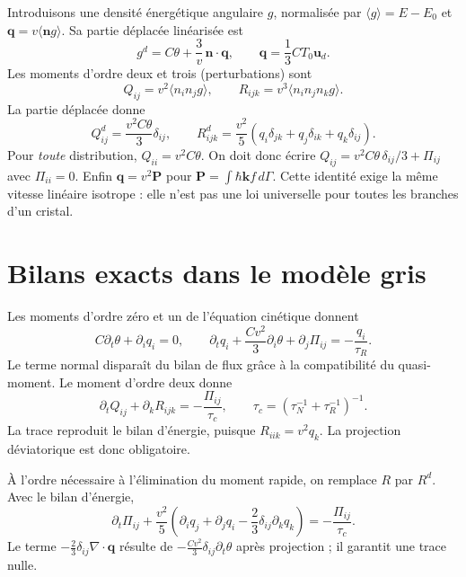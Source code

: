 \documentclass[11pt,a4paper]{article}
\begin{document}
Introduisons une densité énergétique angulaire $g$, normalisée par
$\langle g\rangle=E-E_0$ et $\mathbf q=v\langle\mathbf n g\rangle$.
Sa partie déplacée linéarisée est
\[
 g^d=C\theta+\frac3v\,\mathbf n\cdot\mathbf q,\qquad
 \mathbf q=\frac13CT_0\mathbf u_d .
\]
Les moments d'ordre deux et trois (perturbations) sont
\[
 Q_{ij}=v^2\langle n_i n_j g\rangle,\qquad
 R_{ijk}=v^3\langle n_i n_j n_k g\rangle.
\]
La partie déplacée donne
\[
 Q^d_{ij}=\frac{v^2C\theta}{3}\delta_{ij},\qquad
 R^d_{ijk}=\frac{v^2}{5}
 (q_i\delta_{jk}+q_j\delta_{ik}+q_k\delta_{ij}).
\]
Pour \emph{toute} distribution, $Q_{ii}=v^2C\theta$.
On doit donc écrire $Q_{ij}=v^2C\theta\,\delta_{ij}/3+\Pi_{ij}$
avec $\Pi_{ii}=0$.
Enfin $\mathbf q=v^2\mathbf P$ pour
$\mathbf P=\int\hbar\mathbf k f\,d\Gamma$.
Cette identité exige la même vitesse linéaire isotrope : elle n'est pas
une loi universelle pour toutes les branches d'un cristal.

\section{Bilans exacts dans le modèle gris}
Les moments d'ordre zéro et un de l'équation cinétique donnent
\[
 C\partial_t\theta+\partial_iq_i=0,\qquad
 \partial_tq_i+\frac{Cv^2}{3}\partial_i\theta+\partial_j\Pi_{ij}
 =-\frac{q_i}{\tau_R}.
\]
Le terme normal disparaît du bilan de flux grâce à la compatibilité du
quasi-moment. Le moment d'ordre deux donne
\[
 \partial_t Q_{ij}+\partial_k R_{ijk}
 =-\frac{\Pi_{ij}}{\tau_c},\qquad
 \tau_c=\left(\tau_N^{-1}+\tau_R^{-1}\right)^{-1}.
\]
La trace reproduit le bilan d'énergie, puisque $R_{iik}=v^2q_k$.
La projection déviatorique est donc obligatoire.

À l'ordre nécessaire à l'élimination du moment rapide, on remplace
$R$ par $R^d$. Avec le bilan d'énergie,
\[
 \partial_t\Pi_{ij}+
 \frac{v^2}{5}\left(\partial_iq_j+\partial_jq_i
             -\frac23\delta_{ij}\partial_kq_k\right)
 =-\frac{\Pi_{ij}}{\tau_c}.
\]
Le terme $-\frac23\delta_{ij}\nabla\cdot\mathbf q$ résulte de
$-\frac{Cv^2}{3}\delta_{ij}\partial_t\theta$ après projection ;
il garantit une trace nulle.
\end{document}
